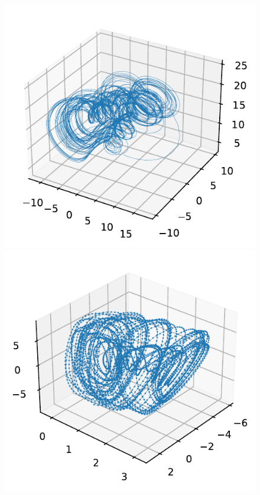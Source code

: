 \documentclass[pdf, hyperref={unicode}, aspectratio=169]{beamer}
\begin{document}
\begin{frame}
\begin{figure}
\includegraphics[height=0.38\textheight]{img/generator2}\hfill
\includegraphics[height=0.38\textheight]{img/torus}\hfill

\end{figure}
\end{frame}
\end{document}
